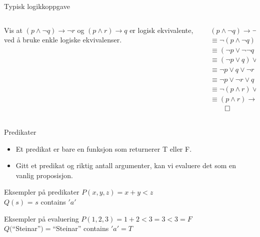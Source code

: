 \begin{frame}{Typisk logikkoppgave}
    \begin{columns}
    \begin{column}{0.48\textwidth}
        Vis at $(p \land \lnot q) \rightarrow \lnot r$ og $(p \land r) \rightarrow q$ er logisk ekvivalente, ved å bruke enkle logiske ekvivalenser.\\[1cm]
    \end{column}
    \begin{column}{0.48\textwidth}
            \pause
            $(p \land \lnot q) \rightarrow \lnot r$ \\
            \pause
            $\equiv \lnot (p \land \lnot q) \lor \lnot r$ \\
            \pause
            $\equiv (\lnot p \lor \lnot \lnot q) \lor \lnot r$ \\
            \pause
            $\equiv (\lnot p \lor q) \lor \lnot r$ \\
            \pause
            $\equiv \lnot p \lor q \lor \lnot r$ \\
            \pause
            $\equiv \lnot p \lor \lnot r \lor q$ \\
            \pause
            $\equiv \lnot (p \land r) \lor q$ \\
            \pause
            $\equiv (p \land r) \rightarrow q$
            $\qed$
    \end{column}
    \end{columns}
\end{frame}

\begin{frame}{Predikater}
    \begin{itemize}
        \item Et predikat er bare en funksjon som returnerer T eller F.
        \item Gitt et predikat og riktig antall argumenter, kan vi evaluere det som en vanlig proposisjon.
    \end{itemize}
    \begin{block}{Eksempler på predikater}
        $P(x, y, z) = x + y < z$\\
        $Q(s)$ = $s$ contains $'a'$
    \end{block}
    \pause
    \begin{block}{Eksempler på evaluering}
        $P(1, 2, 3) = 1 + 2 < 3 = 3 < 3 = F$ \\ 
        $Q($\enquote{Steinar}$) = $\enquote{Steinar} contains $'a' = T$
    \end{block}

\end{frame}

